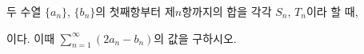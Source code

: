 두 수열 $\{a_n\}$, $\{b_n\}$의 첫째항부터 제$n$항까지의 합을 각각 $S_n$, $T_n$이라 할 때, \par\smallskip{}\par\smallskip\noindent 이다. 이때 $\displaystyle\sum_{n=1}^{\infty}(2a_n-b_n)$의 값을 구하시오.
